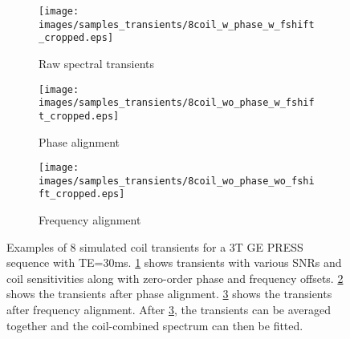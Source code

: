 \begin{figure}[b]
    \centering
    \begin{subfigure}{0.32\textwidth}
        \texttt{[image: images/samples\_transients/8coil\_w\_phase\_w\_fshift\_cropped.eps]}
        \caption{Raw spectral transients}
        \label{subfig:raw transients}        
    \end{subfigure}
    \begin{subfigure}{0.32\textwidth}
        \texttt{[image: images/samples\_transients/8coil\_wo\_phase\_w\_fshift\_cropped.eps]}
        \caption{Phase alignment}
        \label{subfig:phase alignment}        
    \end{subfigure}
    \begin{subfigure}{0.32\textwidth}
        \texttt{[image: images/samples\_transients/8coil\_wo\_phase\_wo\_fshift\_cropped.eps]}
        \caption{Frequency alignment}
        \label{subfig:frequency alignment}        
    \end{subfigure}
    \caption{Examples of 8 simulated coil transients for a 3T GE PRESS sequence with TE=30ms. \ref{subfig:raw transients} shows transients with various SNRs and coil sensitivities along with zero-order phase and frequency offsets. \ref{subfig:phase alignment} shows the transients after phase alignment. \ref{subfig:frequency alignment} shows the transients after frequency alignment. After \ref{subfig:frequency alignment}, the transients can be averaged together and the coil-combined spectrum can then be fitted.}
    \label{fig:simulated transients}
\end{figure}
